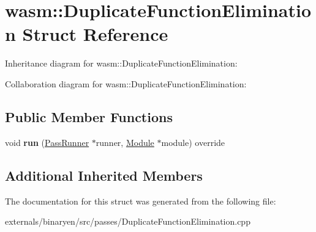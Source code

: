 \hypertarget{structwasm_1_1_duplicate_function_elimination}{}\section{wasm\+:\+:Duplicate\+Function\+Elimination Struct Reference}
\label{structwasm_1_1_duplicate_function_elimination}


Inheritance diagram for wasm\+:\+:Duplicate\+Function\+Elimination\+:


Collaboration diagram for wasm\+:\+:Duplicate\+Function\+Elimination\+:
\subsection*{Public Member Functions}
\begin{DoxyCompactItemize}
\item 
\mbox{\label{structwasm_1_1_duplicate_function_elimination_a6850f01b54e6614ae487c8ca83422969}} 
void {\bfseries run} (\mbox{\hyperlink{structwasm_1_1_pass_runner}{Pass\+Runner}} $\ast$runner, \mbox{\hyperlink{classwasm_1_1_module}{Module}} $\ast$module) override
\end{DoxyCompactItemize}
\subsection*{Additional Inherited Members}


The documentation for this struct was generated from the following file\+:\begin{DoxyCompactItemize}
\item 
externals/binaryen/src/passes/Duplicate\+Function\+Elimination.\+cpp\end{DoxyCompactItemize}
